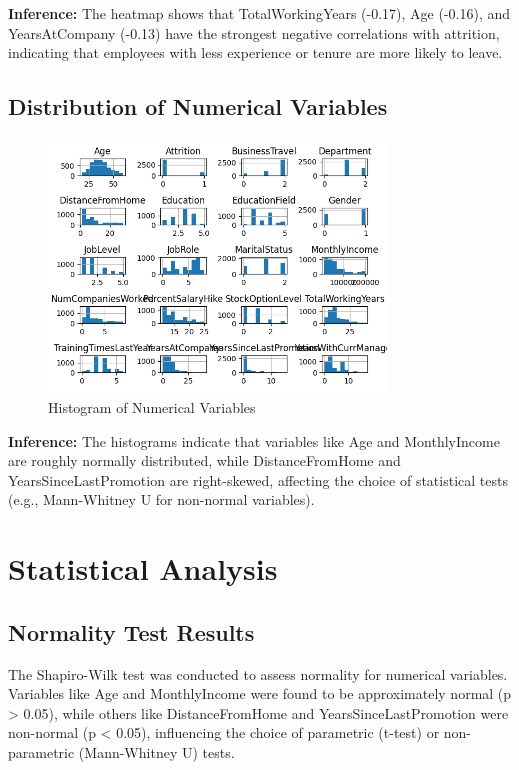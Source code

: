 \documentclass[12pt, a4paper]{article}
\begin{document}
\textbf{Inference:} The heatmap shows that TotalWorkingYears (-0.17), Age (-0.16), and YearsAtCompany (-0.13) have the strongest negative correlations with attrition, indicating that employees with less experience or tenure are more likely to leave.

\subsection{Distribution of Numerical Variables}
\begin{figure}[H]
    \centering
    \includegraphics[width=0.8\textwidth]{plots/attrition_histogram.png}
    \caption{Histogram of Numerical Variables}
    \label{fig:attrition_histogram}
\end{figure}

\textbf{Inference:} The histograms indicate that variables like Age and MonthlyIncome are roughly normally distributed, while DistanceFromHome and YearsSinceLastPromotion are right-skewed, affecting the choice of statistical tests (e.g., Mann-Whitney U for non-normal variables).

\section{Statistical Analysis}
\subsection{Normality Test Results}
The Shapiro-Wilk test was conducted to assess normality for numerical variables. Variables like Age and MonthlyIncome were found to be approximately normal (p > 0.05), while others like DistanceFromHome and YearsSinceLastPromotion were non-normal (p < 0.05), influencing the choice of parametric (t-test) or non-parametric (Mann-Whitney U) tests.
\end{document}
